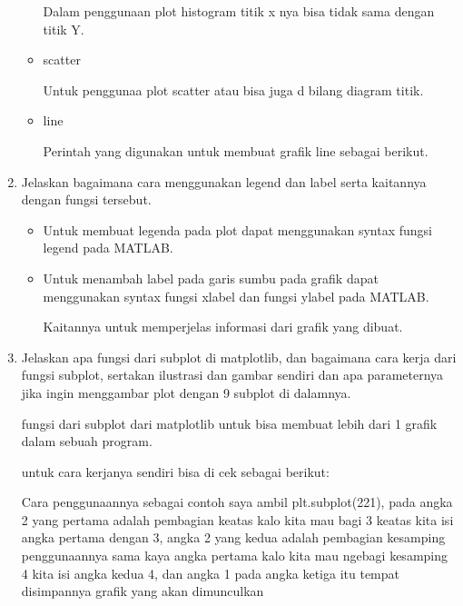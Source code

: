 \begin{enumerate}
\begin{itemize}
        Dalam penggunaan plot histogram titik x nya bisa tidak sama dengan titik Y.
        
        \item scatter
        
        Untuk penggunaa plot scatter atau bisa juga d bilang diagram titik.
        
        \item line
        
        Perintah yang digunakan untuk membuat grafik line sebagai berikut.
        
    \end{itemize}
    
    \item Jelaskan bagaimana cara menggunakan legend dan label serta kaitannya dengan fungsi tersebut.
    \begin{itemize}
        \item Untuk membuat legenda pada plot dapat menggunakan syntax fungsi legend pada MATLAB.
        
        \item Untuk menambah label pada garis sumbu pada grafik dapat menggunakan syntax fungsi xlabel dan fungsi ylabel pada MATLAB.
        
        \par Kaitannya untuk memperjelas informasi dari grafik yang dibuat.
    \end{itemize}
    
    \item Jelaskan apa fungsi dari subplot di matplotlib, dan bagaimana cara kerja dari fungsi subplot, sertakan ilustrasi dan gambar sendiri dan apa parameternya jika ingin menggambar plot dengan 9 subplot di dalamnya.
    \par fungsi dari subplot dari matplotlib untuk bisa membuat lebih dari 1 grafik dalam sebuah program.
    \par untuk cara kerjanya sendiri bisa di cek sebagai berikut:
    
    \par Cara penggunaannya sebagai contoh saya ambil plt.subplot(221), pada angka 2 yang pertama adalah pembagian keatas kalo kita mau bagi 3 keatas kita isi angka pertama dengan 3, angka 2 yang kedua adalah pembagian kesamping penggunaannya sama kaya angka pertama kalo kita mau ngebagi kesamping 4 kita isi angka kedua 4, dan angka 1 pada angka ketiga itu tempat disimpannya grafik yang akan dimunculkan
    

\end{enumerate}
